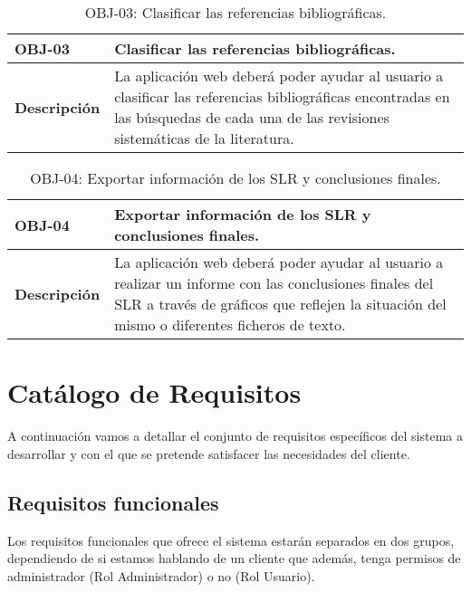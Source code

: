 \begin{table}[!hbt]
	\begin{center}
		\begin{tabular}{|p{3cm}|p{12cm}|}
			\hline
			\textbf{OBJ-03} & Clasificar las referencias bibliográficas.\\
			\hline
			\textbf{Descripción} & La aplicación web deberá poder ayudar al usuario a clasificar las referencias bibliográficas encontradas en las búsquedas de cada una de las revisiones sistemáticas de la literatura.\\
			\hline
		\end{tabular}
		\caption{OBJ-03: Clasificar las referencias bibliográficas.}
		\label{table:obj03}
	\end{center}
\end{table}

\begin{table}[!hbt]
	\begin{center}
		\begin{tabular}{|p{3cm}|p{12cm}|}
			\hline
			\textbf{OBJ-04} & Exportar información de los SLR y conclusiones finales.\\
			\hline
			\textbf{Descripción} & La aplicación web deberá poder ayudar al usuario a realizar un informe con las conclusiones finales del SLR a través de gráficos que reflejen la situación del mismo o diferentes ficheros de texto.\\
			\hline
		\end{tabular}
		\caption{OBJ-04: Exportar información de los SLR y conclusiones finales.}
		\label{table:obj04}
	\end{center}
\end{table}

\section{Catálogo de Requisitos}
A continuación vamos a detallar el conjunto de requisitos específicos del sistema a desarrollar y con el que se pretende satisfacer las necesidades del cliente.

\subsection{Requisitos funcionales}
Los requisitos funcionales que ofrece el sistema estarán separados en dos grupos, dependiendo de si estamos hablando de un cliente que además, tenga permisos de administrador (Rol Administrador) o no (Rol Usuario).

